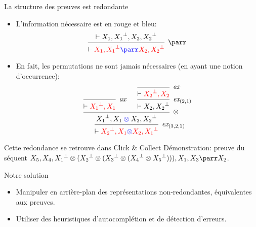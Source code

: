 \documentclass{beamer}
\newcommand*{\orth}{^\perp}
\newcommand*{\tensor}{\otimes}
\newcommand*{\hypv}[1]{\hypo{\vdash #1}}
\newcommand*{\axv}[1]{\infer{0}[\ensuremath{\mathit{ax}}]{\vdash #1}}
\newcommand*{\permv}[2]{\infer{1}[\ensuremath{\textit{ex}_{#1}}]{\vdash #2}}
\newcommand*{\foblig}[1]{\textcolor{red}{#1}}
\begin{document}
\begin{frame}{La structure des preuves est redondante}
    \begin{itemize}
        \item L'information nécessaire est en rouge et bleu:
            \begin{equation*}
            \begin{prooftree}
                \hypv{X_1, {X_1}\orth, X_2, {X_2}\orth}
                {\infer{1}[{\ensuremath{\parr}}]{\vdash \textcolor{red}{X_1, {X_1}\orth} \textcolor{blue}{\parr} \textcolor{red}{X_2, {X_2}\orth}}}
            \end{prooftree}
            \end{equation*}
            \pause
        \item En fait, les permutations ne sont jamais nécessaires (en ayant une notion d'occurrence):
            \begin{equation*}
                \begin{prooftree}
                    \axv{\foblig{{X_1}\orth, X_1}}
                    \axv{\foblig{{X_2}\orth, X_2}}
                    \permv{(2, 1)}{X_2, {X_2}\orth}
                    {\infer{2}[{\ensuremath{\tensor}}]{{X_1}\orth, X_1 \mathbin{\textcolor{blue}{\tensor}} X_2, {X_2}\orth}}
                    \permv{(3, 2, 1)}{\foblig{{X_2}\orth, X_1 \textcolor{blue}{\tensor} X_2, {X_1}\orth}}
                \end{prooftree}
            \end{equation*}
    \end{itemize}
\end{frame}

\begin{frame}{Cette redondance se retrouve dans Click \& Collect}
    Démonstration: preuve du séquent \href{https://click-and-collect.linear-logic.org/?s=X5\%2C+X4\%2C+X1\%5E*\%28X2\%5E*\%28X3\%5E*\%28X4\%5E*X5\%5E\%29\%29\%29\%2C+X1\%2C+X3\%7CX2\&p=XQAAgAD\%2F\%2F\%2F\%2F\%2F\%2F\%2F\%2F\%2F\%2FwA9iIoHZADSvL4AO2WnajJ4cSZ3uOM1Jm1oajsTKyplYJRzl9eyXig67oHQyYTslPOo\%2BS2ySclrzYZQsc\%2FgLOTzu63lNRw2KDawMsWINb50Dd2mW9F4nau8s\%2BcliRr6SbJaTPcU43uRBOW2\%2FLU4QfFpWJxnoJJ\%2FLRxLLDF\%2F3YWEtlM2pJUk12\%2BHw2CFmDiXAAS6XnaWfR\%2B19b\%2F\%2FoR1oAA\%3D\%3D}{$X_5, X_4, {X_1}\orth \tensor ({X_2}\orth \tensor ({X_3}\orth \tensor ({X_4}\orth \tensor {X_5}\orth))), X_1, X_3 \parr X_2$}.
\end{frame}

\begin{frame}{Notre solution}
    \begin{itemize}
        \item Manipuler en arrière-plan des représentations non-redondantes, équivalentes aux preuves.
        \item Utiliser des heuristiques d'autocomplétion et de détection d'erreurs.
     \end{itemize}
\end{frame}
\end{document}
